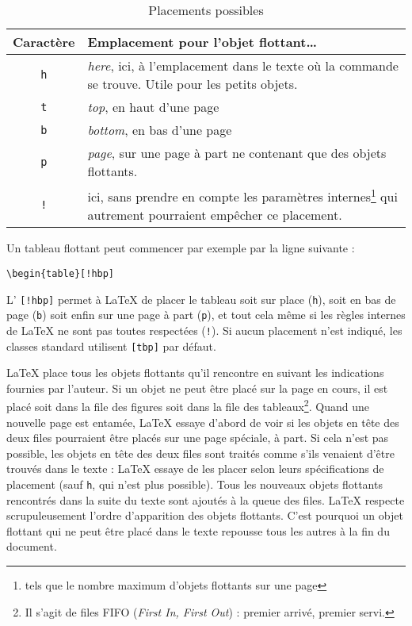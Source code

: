 \begin{table}[!htbp]
\caption{Placements possibles}\label{tab:permiss}
\noindent \begin{minipage}{\textwidth}
\medskip
\begin{center}
\begin{tabular}{@{}cp{8cm}@{}}
Caractère & Emplacement pour l'objet flottant\dots\\
\hline
\rule{0pt}{1.05em}%
\texttt{h} & \emph{here}, ici, à l'emplacement dans
	     le texte où la commande se trouve. Utile pour les petits
	     objets.\\[0.3ex]
\texttt{t} & \emph{top}, en haut d'une page\\[0.3ex]
\texttt{b} & \emph{bottom}, en bas d'une page\\[0.3ex]
\texttt{p} & \emph{page}, sur une page à part ne contenant que des
             objets flottants.\\[0.3ex]
\texttt{!} & ici, sans prendre en compte les paramètres
             internes\footnote{tels que le nombre maximum d'objets
             flottants sur une page} qui autrement pourraient empêcher ce
             placement.
\end{tabular}
\end{center}
\end{minipage}
\end{table}

Un tableau flottant peut commencer par exemple par la ligne suivante :
\begin{code}
\verb|\begin{table}[!hbp]|
\end{code}
\noindent L' \verb|[!hbp]| permet à \LaTeX{} de placer
le tableau soit sur place (\texttt{h}), soit en bas de page
(\texttt{b}) soit enfin sur une page à part (\texttt{p}), et
tout cela même si les règles internes de \LaTeX{} ne sont pas toutes
respectées (\texttt{!}). Si aucun placement n'est indiqué, les
classes standard utilisent \verb|[tbp]| par défaut.

\LaTeX{} place tous les objets flottants qu'il rencontre
en suivant les indications fournies par l'auteur. Si un objet ne peut
être placé sur la page en cours, il est placé soit dans la file des
figures soit dans la file des tableaux\footnote{Il s'agit de files
FIFO (\emph{First In, First Out}) : premier arrivé, premier servi.}.
Quand une nouvelle page est
entamée, \LaTeX{} essaye d'abord de voir si les objets en tête des
deux files pourraient être placés sur une page spéciale, à part.  Si
cela n'est pas possible, les objets en tête des deux files sont
traités comme s'ils venaient d'être trouvés dans le texte : \LaTeX{}
essaye de les placer selon leurs spécifications de placement (sauf
\texttt{h}, qui n'est plus possible). Tous les
nouveaux objets flottants rencontrés dans la suite du texte sont
ajoutés à la queue des files. \LaTeX{} respecte scrupuleusement
l'ordre d'apparition des objets flottants. C'est pourquoi un objet
flottant qui ne peut être placé dans le texte repousse tous les
autres à la fin du document.

